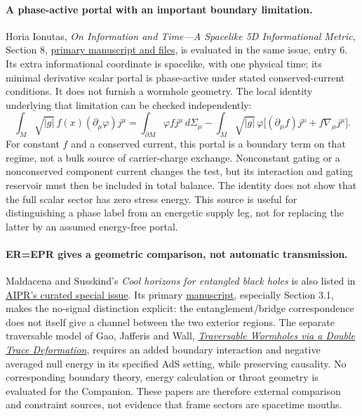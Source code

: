 \documentclass[11pt,a4paper]{article}
\begin{document}
\paragraph{A phase-active portal with an important boundary limitation.}
Horia Ionutas, \emph{On Information and Time---A Spacelike 5D
Informational Metric}, Section 8,
\href{https://zenodo.org/records/20113592}{primary manuscript and files},
is evaluated in the same issue, entry 6. Its extra informational
coordinate is spacelike, with one physical time; its minimal
derivative scalar portal is phase-active under stated conserved-current
conditions. It does not furnish a wormhole geometry. The local
identity underlying that limitation can be checked independently:
\[
 \int_M\!\sqrt{|g|}\,f(x)(\partial_\mu\varphi)j^\mu
 =\int_{\partial M}\!\varphi f j^\mu\,d\Sigma_\mu
 -\int_M\!\sqrt{|g|}\,\varphi
       \bigl[(\partial_\mu f)j^\mu+f\nabla_\mu j^\mu\bigr].
\]
For constant $f$ and a conserved current, this portal is a boundary
term on that regime, not a bulk source of carrier-charge exchange.
Nonconstant gating or a nonconserved component current changes
the test, but its interaction and gating reservoir must then be
included in total balance. The identity does not show that the
full scalar sector has zero stress energy. This source is useful
for distinguishing a phase label from an energetic supply leg,
not for replacing the latter by an assumed energy-free portal.

\paragraph{ER=EPR gives a geometric comparison, not automatic transmission.}
Maldacena and Susskind's \emph{Cool horizons for entangled black holes}
is also listed in
\href{https://aiphysicsreview.org/issue-2026-s1/#paper-004}{AIPR's curated
special issue}. Its primary
\href{https://arxiv.org/abs/1306.0533}{manuscript}, especially
Section 3.1, makes the no-signal distinction explicit: the
entanglement/bridge correspondence does not itself give a channel
between the two exterior regions. The separate traversable model
of Gao, Jafferis and Wall,
\href{https://arxiv.org/abs/1608.05687}{\emph{Traversable Wormholes via
a Double Trace Deformation}}, requires an added boundary interaction
and negative averaged null energy in its specified AdS setting,
while preserving causality. No corresponding boundary theory,
energy calculation or throat geometry is evaluated for the Companion.
These papers are therefore external comparison and constraint
sources, not evidence that frame sectors are spacetime mouths.
\end{document}
